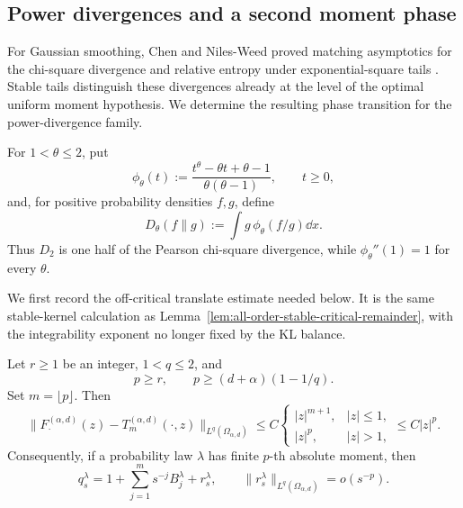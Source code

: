 \subsection{Power divergences and a second moment phase}
\label{subsec:stable-power-divergence-phase}

For Gaussian smoothing, Chen and Niles-Weed proved matching asymptotics for
the chi-square divergence and relative entropy under exponential-square
tails \cite[Theorem~2.5]{ChenNilesWeed2022SmoothedWasserstein}.  Stable
tails distinguish these divergences already at the level of the optimal
uniform moment hypothesis.  We determine the resulting phase transition
for the power-divergence family.

For \(1<\theta\le2\), put
\begin{equation}\label{eq:stable-power-generator}
 \phi_\theta(t)
 :=\frac{t^\theta-\theta t+\theta-1}{\theta(\theta-1)},
 \qquad t\ge0,
\end{equation}
and, for positive probability densities \(f,g\), define
\begin{equation}\label{eq:stable-power-divergence}
 D_\theta(f\|g):=\int g\,\phi_\theta(f/g)\dd x.
\end{equation}
Thus \(D_2\) is one half of the Pearson chi-square divergence, while
\(\phi_\theta''(1)=1\) for every \(\theta\).

We first record the off-critical translate estimate needed below.  It is
the same stable-kernel calculation as
Lemma~\ref{lem:all-order-stable-critical-remainder}, with the integrability
exponent no longer fixed by the KL balance.

\begin{lemma}
\label{lem:off-critical-stable-translation-remainder}
Let \(r\ge1\) be an integer, \(1<q\le2\), and
\begin{equation}\label{eq:off-critical-stable-exponent-conditions}
 p\ge r,
 \qquad p\ge(d+\alpha)(1-1/q).
\end{equation}
Set \(m=\lfloor p\rfloor\).  Then
\begin{equation}\label{eq:off-critical-stable-remainder}
 \|F_\cdot^{(\alpha,d)}(z)-T_m^{(\alpha,d)}(\cdot,z)\|_{L^q(\Omega_{\alpha,d})}
 \le C
 \begin{cases}
  |z|^{m+1},&|z|\le1,\\
  |z|^p,&|z|>1,
 \end{cases}
 \le C|z|^p.
\end{equation}
Consequently, if a probability law \(\lambda\) has finite \(p\)-th
absolute moment, then
\begin{equation}\label{eq:off-critical-stable-integrated-remainder}
 q_s^\lambda
 =1+\sum_{j=1}^m s^{-j}B_j^\lambda+r_s^\lambda,
 \qquad
 \|r_s^\lambda\|_{L^q(\Omega_{\alpha,d})}=o(s^{-p}).
\end{equation}
\end{lemma}

